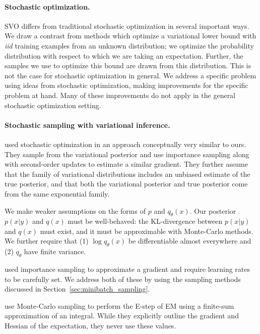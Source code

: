 \paragraph{Stochastic optimization.}
SVO differs from traditional stochastic optimization in several
important ways.  We draw a contrast from methods which optimize a
variational lower bound with \emph{iid} training examples
\citep{hoffman:2010} from an unknown distribution; we optimize the
probability distribution with respect to which we are taking an
expectation.  Further, the samples we use to optimize this bound are
drawn from this distribution.  This is not the case for stochastic
optimization in general.
We address a specific problem using ideas from stochastic
optimization, making improvements for the specific problem at hand.
Many of these improvements do not apply in the general stochastic
optimization setting.

\paragraph{Stochastic sampling with variational inference.}
\cite{carbonetto:2009} used stochastic optimization in an approach
conceptually very similar to ours.  They sample from the variational
posterior and use importance sampling along with second-order updates
to estimate a similar gradient.  They further
assume that the family of variational distributions includes an
unbiased estimate of the true posterior, and that both the variational
posterior and true posterior come from the same exponential family.

We make weaker assumptions on the forms of $p$ and $q_\theta(x)$. Our
posterior $p(x | y)$ and $q(x)$ must be well-behaved: the
KL-divergence between $p(x | y)$ and $q(x)$ must exist, and it must be
approximable with Monte-Carlo methods.  We further require that (1)
$\log q_\theta(x)$ be differentiable almost everywhere and (2)
$q_\theta$ have finite variance.

\cite{carbonetto:2009} used importance sampling to approximate a
gradient and require learning rates to be carefully set.  We address
both of these by using the sampling methods discussed in
Section~\ref{sec:minibatch_sampling}.

\cite{wei:1990} use Monte-Carlo sampling to perform the E-step of EM
using a finite-sum approximation of an integral. While they
explicitly outline the gradient and Hessian of the expectation, they
never use these values.


